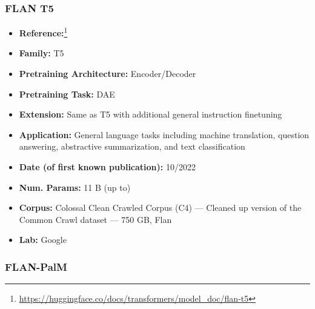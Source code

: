 \documentclass{article}
\begin{document}
\subsubsection{FLAN T5}

            \begin{itemize}
                \item \textbf{Reference:}\footnote{\url{https://huggingface.co/docs/transformers/model_doc/flan-t5}}\cite{chung2022flan}
                \item \textbf{Family:} T5
                \item \textbf{Pretraining Architecture:} Encoder/Decoder
                \item \textbf{Pretraining Task:} DAE
                \item \textbf{Extension:} Same as T5 with additional general instruction finetuning
                \item \textbf{Application:} General language tasks including machine translation, question answering, abstractive summarization, and text classification
                \item \textbf{Date (of first known publication):} 10/2022
                \item \textbf{Num. Params:} 11 B (up to)
                \item \textbf{Corpus:} Colossal Clean Crawled Corpus (C4) — Cleaned up version of the Common Crawl dataset — 750 GB, Flan
                \item \textbf{Lab:} Google
            \end{itemize}

\subsubsection{FLAN-PalM}
\end{document}
